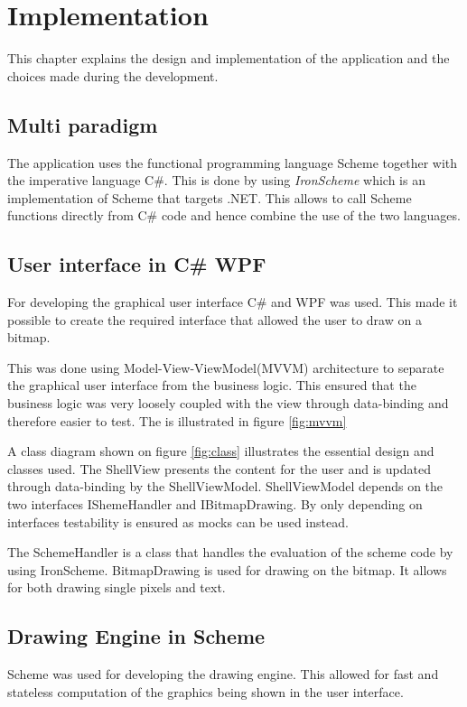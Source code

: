 \chapter{Implementation} 
\label{chp:impl}

This chapter explains the design and implementation of the application and the choices made during the development.

\section{Multi paradigm}
The application uses the functional programming language Scheme together with the imperative language C\#. This is done by using \emph{IronScheme} which is an implementation of Scheme that targets .NET. This allows to call Scheme functions directly from C\# code and hence combine the use of the two languages.

\section{User interface in C\# WPF}
For developing the graphical user interface C\# and WPF was used. This made it possible to create the required interface that allowed the user to draw on a bitmap.

This was done using Model-View-ViewModel(MVVM) architecture to separate the graphical user interface from the business logic. This ensured that the business logic was very loosely coupled with the view through data-binding and therefore easier to test. The is illustrated in figure \ref{fig:mvvm}


A class diagram shown on figure \ref{fig:class} illustrates the essential design and classes used. The ShellView presents the content for the user and is updated through data-binding by the ShellViewModel. ShellViewModel depends on the two interfaces IShemeHandler and IBitmapDrawing. By only depending on interfaces testability is ensured as mocks can be used instead. 

The SchemeHandler is a class that handles the evaluation of the scheme code by using IronScheme. BitmapDrawing is used for drawing on the bitmap. It allows for both drawing single pixels and text.


\section{Drawing Engine in Scheme}
Scheme was used for developing the drawing engine. This allowed for fast and stateless computation of the graphics being shown in the user interface. 

